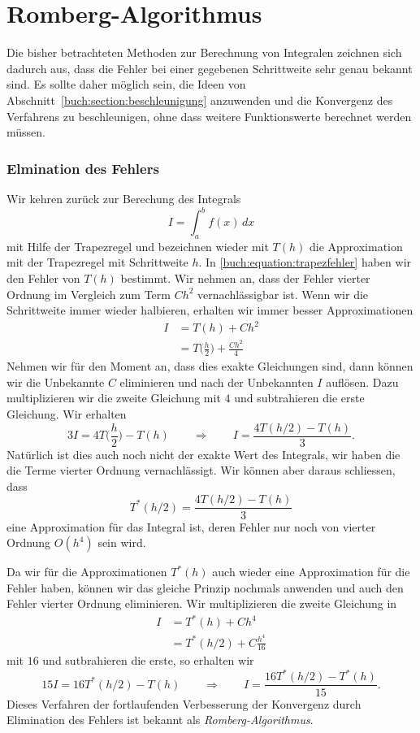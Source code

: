 %
%
%
\section{Romberg-Algorithmus
\label{buch:section:romberg}}
Die bisher betrachteten Methoden zur Berechnung von Integralen zeichnen
sich dadurch aus, dass die Fehler bei einer gegebenen Schrittweite 
sehr genau bekannt sind.
Es sollte daher möglich sein, die Ideen von
Abschnitt~\ref{buch:section:beschleunigung}
anzuwenden und die Konvergenz des Verfahrens zu beschleunigen, ohne
dass weitere Funktionswerte berechnet werden müssen.

\subsubsection{Elmination des Fehlers}
Wir kehren zurück zur Berechung des Integrals
\[
I=\int_a^b f(x)\,dx
\]
mit Hilfe der Trapezregel und bezeichnen wieder mit $T(h)$
die Approximation mit der Trapezregel mit Schrittweite $h$.
In \eqref{buch:equation:trapezfehler} haben wir den Fehler von $T(h)$
bestimmt.
Wir nehmen an, dass der Fehler vierter Ordnung im Vergleich zum Term
$Ch^2$ vernachlässigbar ist.
Wenn wir die Schrittweite immer wieder halbieren, erhalten wir immer besser
Approximationen
\begin{align*}
I&=T(h) + Ch^2
\\
&=T\biggl(\frac{h}2\biggr) + \frac{Ch^2}{4}
\end{align*}
Nehmen wir für den Moment an, dass dies exakte Gleichungen sind, dann
können wir die Unbekannte $C$ eliminieren und nach der Unbekannten $I$
auflösen.
Dazu multiplizieren wir die zweite Gleichung mit $4$ und subtrahieren
die erste Gleichung.
Wir erhalten
\[
3I= 4T\biggl(\frac{h}2\biggr) - T(h)
\qquad\Rightarrow\qquad
I= \frac{4T(h/2) - T(h)}{3}.
\]
Natürlich ist dies auch noch nicht der exakte Wert des Integrals,
wir haben die die Terme vierter Ordnung vernachlässigt.
Wir können aber daraus schliessen, dass 
\[
T^*(h/2) = \frac{4T(h/2)-T(h)}{3}
\]
eine Approximation für das Integral ist, deren Fehler nur noch
von vierter Ordnung $O(h^4)$ sein wird.

Da wir für die Approximationen $T^*(h)$ auch wieder eine Approximation
für die Fehler haben, können wir das gleiche Prinzip nochmals anwenden
und auch den Fehler vierter Ordnung eliminieren.
Wir multiplizieren die zweite Gleichung in
\begin{align*}
I&=T^*(h) + Ch^4 \\
 &=T^*(h/2) + C\frac{h^4}{16}
\end{align*}
mit $16$ und sutbrahieren die erste, so erhalten wir
\[
15I = 16T^*(h/2)-T(h)
\qquad\Rightarrow\qquad
I = \frac{16T^*(h/2)-T^*(h)}{15}.
\]
Dieses Verfahren der fortlaufenden Verbesserung der Konvergenz durch
Elimination des Fehlers ist bekannt als {\em Romberg-Algorithmus}.

